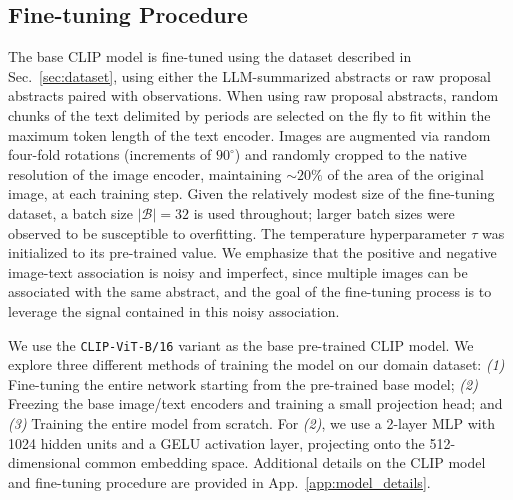 \documentclass{article} %
\begin{document}
   
   \subsection{Fine-tuning Procedure}
   
   The base CLIP model is fine-tuned using the dataset described in Sec.~\ref{sec:dataset}, using either the LLM-summarized abstracts or raw proposal abstracts paired with observations.
   When using raw proposal abstracts, random chunks of the text delimited by periods are selected on the fly to fit within the maximum token length of the text encoder.
   Images are augmented via random four-fold rotations (increments of $90^\circ$) and randomly cropped to the native resolution of the image encoder, maintaining $\sim 20\%$ of the area of the original image, at each training step.
   Given the relatively modest size of the fine-tuning dataset, a batch size $|\mathcal B| = 32$ is used throughout; larger batch sizes were observed to be susceptible to overfitting.
   The temperature hyperparameter $\tau$ was initialized to its pre-trained value.
   We emphasize that the positive and negative image-text association is noisy and imperfect, since multiple images can be associated with the same abstract, and the goal of the fine-tuning process is to leverage the signal contained in this noisy association. 
   
   We use the \texttt{CLIP-ViT-B/16} \citep{radford2021learning} variant as the base pre-trained CLIP model.
  We explore three different methods of training the model on our domain dataset: \emph{(1)} Fine-tuning the entire network starting from the pre-trained base model; \emph{(2)} Freezing the base image/text encoders and training a small projection head; and \emph{(3)} Training the entire model from scratch.
   For \emph{(2)}, we use a 2-layer MLP with 1024 hidden units and a GELU activation layer, projecting onto the 512-dimensional common embedding space. Additional details on the CLIP model and fine-tuning procedure are provided in App.~\ref{app:model_details}.
      
\end{document}

